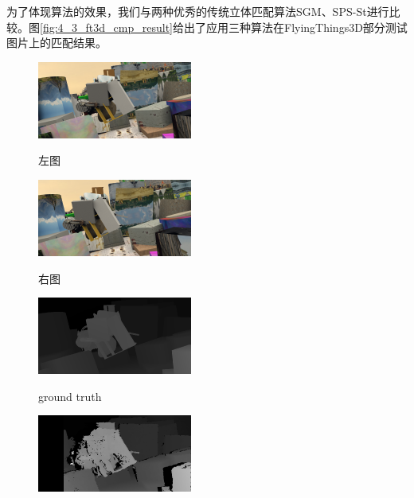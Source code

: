 为了体现算法的效果，我们与两种优秀的传统立体匹配算法SGM\cite{Hirschmuller08}、SPS-St\cite{yamaguchi2014}进行比较。图\ref{fig:4_3_ft3d_cmp_result}给出了应用三种算法在FlyingThings3D部分测试图片上的匹配结果。


\begin{figure}[htbp]
	\begin{minipage}{0.3\linewidth}
		\centerline{\includegraphics[width=2in]{figures/cmp_ft3d/l_000}}
		\vspace{-10pt}
		\centerline{左图}
	\end{minipage}
	\hfill
	\begin{minipage}{.3\linewidth}
		\centerline{\includegraphics[width=2in]{figures/cmp_ft3d/r_000}}
		\vspace{-10pt}
		\centerline{右图}
	\end{minipage}
	\hfill
	\begin{minipage}{0.3\linewidth}
		\centerline{\includegraphics[width=2in]{figures/cmp_ft3d/gt_000}}
		\vspace{-10pt}
		\centerline{ground truth}
	\end{minipage}
	\vfill
	\begin{minipage}{0.3\linewidth}
		\centerline{\includegraphics[width=2in]{figures/cmp_ft3d/sgm_000}}

\end{minipage}
\end{figure}
